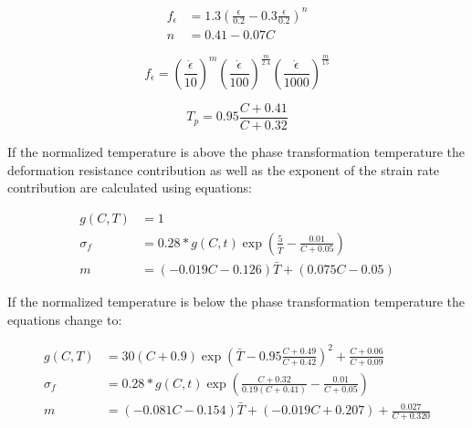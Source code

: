\documentclass[11pt]{PyRollDocs}
\begin{document}
    \begin{equation}
        \begin{aligned}
            f_{\epsilon} &= 1.3 \left( \frac{\epsilon}{0.2} - 0.3 \frac{\epsilon}{0.2} \right)^n \\
            n &= 0.41-0.07 C
        \end{aligned}
        \label{eq:strain-contribution}
    \end{equation}

    \begin{equation}
        f_{\dot{\epsilon}} = \left( \frac{\dot{\epsilon}}{10} \right)^m \left( \frac{\dot{\epsilon}}{100} \right)^{\frac{m}{2.4}} \left( \frac{\dot{\epsilon}}{1000} \right)^{\frac{m}{15}}
        \label{eq:strain-rate-contribution}
    \end{equation}

    \begin{equation}
        T_p = 0.95 \frac{C + 0.41}{C+ 0.32}
        \label{eq:phase-transformation-temperature}
    \end{equation}

    If the normalized temperature is above the phase transformation temperature the deformation resistance contribution as well as the exponent of the strain rate contribution are calculated using equations:

    \begin{equation}
        \begin{aligned}
            g(C,T) &= 1 \\
            \sigma_f &= 0.28 * g(C,t) \exp \left( \frac{5}{\bar{T}} - \frac{0.01}{C + 0.05} \right) \\
            m &= (-0.019C - 0.126)\bar{T} + (0.075C-0.05)
        \end{aligned}
        \label{eq:above-phase-transformation}
    \end{equation}

    If the normalized temperature is below the phase transformation temperature the equations change to:

    \begin{equation}
        \begin{aligned}
            g(C,T) &= 30 ( C +0.9) \exp \left( \bar{T} - 0.95 \frac{C + 0.49}{C +0.42} \right)^2 + \frac{C + 0.06}{C + 0.09} \\
            \sigma_f &= 0.28 * g(C,t) \exp \left( \frac{C + 0.32}{0.19 (C + 0.41)} - \frac{0.01}{C + 0.05} \right) \\
            m &= (-0.081 C - 0.154) \bar{T} + (-0.019 C + 0.207) + \frac{0.027}{C+0.320}
        \end{aligned}
        \label{eq:below-phase-transformation}
    \end{equation}
\end{document}
